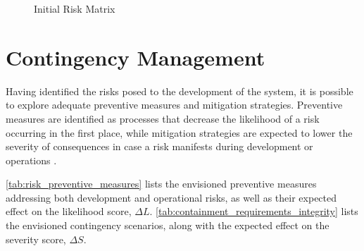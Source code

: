 \begin{figure}[H]
\caption{Initial Risk Matrix}
\label{fig:risk_matrix}
\end{figure}



\section{Contingency Management}
\label{sec:contingency_management}


Having identified the risks posed to the development of the system, it is possible to explore adequate preventive measures and mitigation strategies. Preventive measures are identified as processes that decrease the likelihood of a risk occurring in the first place, while mitigation strategies are expected to lower the severity of consequences in case a risk manifests during development or operations \cite{MITRECorporation2012}. 

\autoref{tab:risk_preventive_measures} lists the envisioned preventive measures addressing both development and operational risks, as well as their expected effect on the likelihood score, $\Delta L$. \autoref{tab:containment_requirements_integrity} lists the envisioned contingency scenarios, along with the expected effect on the severity score, $\Delta S$.

